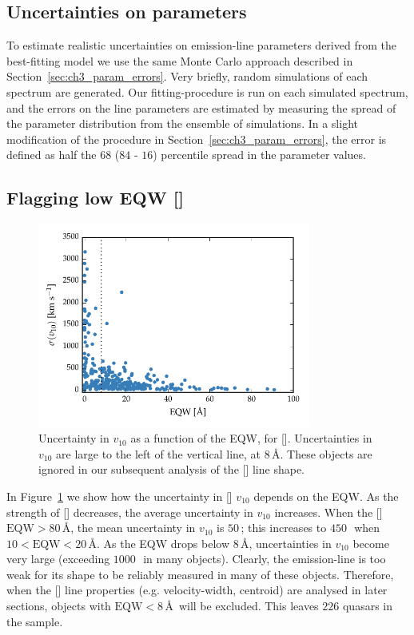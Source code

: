 \subsection{Uncertainties on parameters}

To estimate realistic uncertainties on emission-line parameters derived from the best-fitting model we use the same Monte Carlo approach described in Section~\ref{sec:ch3_param_errors}. 
Very briefly, random simulations of each spectrum are generated.
Our fitting-procedure is run on each simulated spectrum, and the errors on the line parameters are estimated by measuring the spread of the parameter distribution from the ensemble of simulations. 
In a slight modification of the procedure in Section~\ref{sec:ch3_param_errors}, the error is defined as half the $68$ ($84$ - $16$) percentile spread in the parameter values. 

\subsection{Flagging low EQW []}
\label{sec:ch4-loweqw}

\begin{figure}
    \centering
    \includegraphics[width=0.8\textwidth]{figures/chapter04/eqw_cut.pdf} 
    \caption[{Uncertainty in $v_{10}$ as a function of the EQW.}]{Uncertainty in $v_{10}$ as a function of the EQW, for []. Uncertainties in $v_{10}$ are large to the left of the vertical line, at $8$\,\AA. These objects are ignored in our subsequent analysis of the [] line shape.}     
    \label{fig:eqw_cut}
\end{figure}

In Figure~\ref{fig:eqw_cut} we show how the uncertainty in [] $v_{10}$ depends on the EQW. 
As the strength of [] decreases, the average uncertainty in $v_{10}$ increases.
When the [] $\text{EQW} > 80$\,\AA, the mean uncertainty in $v_{10}$ is $50$\,\kms; this increases to $450$\,\kms\, when $10 < \text{EQW} < 20$\,\AA. 
As the EQW drops below $8$\,\AA, uncertainties in $v_{10}$ become very large (exceeding $1000$\,\kms\, in many objects). 
Clearly, the emission-line is too weak for its shape to be reliably measured in many of these objects. 
Therefore, when the [] line properties (e.g. velocity-width, centroid) are analysed in later sections, objects with $\text{EQW} < 8$\,\AA\, will be excluded. 
This leaves $226$ quasars in the sample. 

